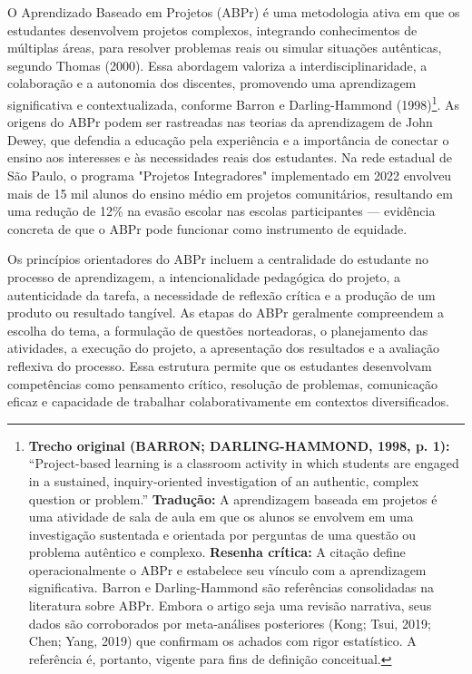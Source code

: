 O Aprendizado Baseado em Projetos (ABPr) é uma metodologia ativa em que os estudantes desenvolvem projetos complexos, integrando conhecimentos de múltiplas áreas, para resolver problemas reais ou simular situações autênticas, segundo Thomas (2000). Essa abordagem valoriza a interdisciplinaridade, a colaboração e a autonomia dos discentes, promovendo uma aprendizagem significativa e contextualizada, conforme Barron e Darling-Hammond (1998)\footnote{\textbf{Trecho original (BARRON; DARLING-HAMMOND, 1998, p. 1):} ``Project-based learning is a classroom activity in which students are engaged in a sustained, inquiry-oriented investigation of an authentic, complex question or problem.'' \textbf{Tradução:} A aprendizagem baseada em projetos é uma atividade de sala de aula em que os alunos se envolvem em uma investigação sustentada e orientada por perguntas de uma questão ou problema autêntico e complexo. \textbf{Resenha crítica:} A citação define operacionalmente o ABPr e estabelece seu vínculo com a aprendizagem significativa. Barron e Darling-Hammond são referências consolidadas na literatura sobre ABPr. Embora o artigo seja uma revisão narrativa, seus dados são corroborados por meta-análises posteriores (Kong; Tsui, 2019; Chen; Yang, 2019) que confirmam os achados com rigor estatístico. A referência é, portanto, vigente para fins de definição conceitual.}. As origens do ABPr podem ser rastreadas nas teorias da aprendizagem de John Dewey, que defendia a educação pela experiência e a importância de conectar o ensino aos interesses e às necessidades reais dos estudantes. Na rede estadual de São Paulo, o programa "Projetos Integradores" implementado em 2022 envolveu mais de 15 mil alunos do ensino médio em projetos comunitários, resultando em uma redução de 12\% na evasão escolar nas escolas participantes — evidência concreta de que o ABPr pode funcionar como instrumento de equidade.

Os princípios orientadores do ABPr incluem a centralidade do estudante no processo de aprendizagem, a intencionalidade pedagógica do projeto, a autenticidade da tarefa, a necessidade de reflexão crítica e a produção de um produto ou resultado tangível. As etapas do ABPr geralmente compreendem a escolha do tema, a formulação de questões norteadoras, o planejamento das atividades, a execução do projeto, a apresentação dos resultados e a avaliação reflexiva do processo. Essa estrutura permite que os estudantes desenvolvam competências como pensamento crítico, resolução de problemas, comunicação eficaz e capacidade de trabalhar colaborativamente em contextos diversificados.


